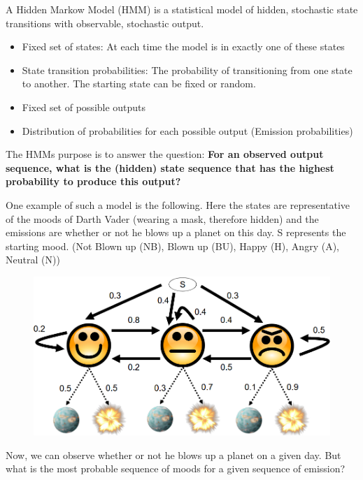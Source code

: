 \documentclass[
../../NLP4W_Summary.tex,
]
{subfiles}
\begin{document}
A Hidden Markow Model (HMM) is a statistical model of hidden, stochastic state transitions with observable, stochastic output. 

\begin{defbox}
    \begin{itemize}
        \item Fixed set of states: At each time the model is in exactly one of these states
        \item State transition probabilities: The probability of transitioning from one state to another. The starting state can be fixed or random.
        \item Fixed set of possible outputs
        \item Distribution of probabilities for each possible output (Emission probabilities)
    \end{itemize}
    The HMMs purpose is to answer the question: \textbf{For an observed output sequence, what is the (hidden) state sequence that has the highest probability to produce this output?}
\end{defbox}

One example of such a model is the following. Here the states are representative of the moods of Darth Vader (wearing a mask, therefore hidden) and the emissions are whether or not he blows up a planet on this day. S represents the starting mood. (Not Blown up (NB), Blown up (BU), Happy (H), Angry (A), Neutral (N))

\begin{figure}[htp]
    \centering
    \includegraphics[scale=0.35]{Pics/HMMExampleVader.png}
\end{figure}

Now, we can observe whether or not he blows up a planet on a given day. But what is the most probable sequence of moods for a given sequence of emission? 
\end{document}
